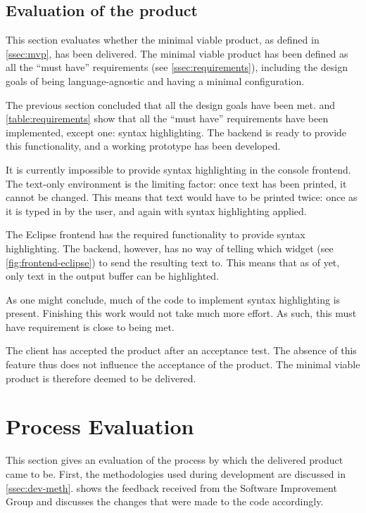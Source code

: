 \subsection{Evaluation of the product}
\label{ssec:eval-product}

This section evaluates whether the minimal viable product, as defined in
\cref{ssec:mvp}, has been delivered. The minimal viable product has been defined
as all the ``must have'' requirements (see \cref{ssec:requirements}), including
the design goals of being language-agnostic and having a minimal configuration.

The previous section concluded that all the design goals have been met.
 and \cref{table:requirements} show that all the
``must have'' requirements have been implemented, except one: syntax
highlighting. The backend is ready to provide this functionality, and a working
prototype has been developed.

It is currently impossible to provide syntax highlighting in the console
frontend. The text-only environment is the limiting factor: once text has been
printed, it cannot be changed. This means that text would have to be printed
twice: once as it is typed in by the user, and again with syntax highlighting
applied.

The Eclipse frontend has the required functionality to provide syntax
highlighting. The backend, however, has no way of telling which widget (see
\cref{fig:frontend-eclipse}) to send the resulting text to. This means that as
of yet, only text in the output buffer can be highlighted.

As one might conclude, much of the code to implement syntax highlighting is
present. Finishing this work would not take much more effort. As such, this must
have requirement is close to being met.

The client has accepted the product after an acceptance test. The absence of
this feature thus does not influence the acceptance of the product. The minimal
viable product is therefore deemed to be delivered.

\section{Process Evaluation}
\label{sec:process-evaluation}

This section gives an evaluation of the process by which the delivered product
came to be. First, the methodologies used during development are discussed in
\cref{ssec:dev-meth}.  shows the feedback received from the
Software Improvement Group and discusses the changes that were made to the code
accordingly.

